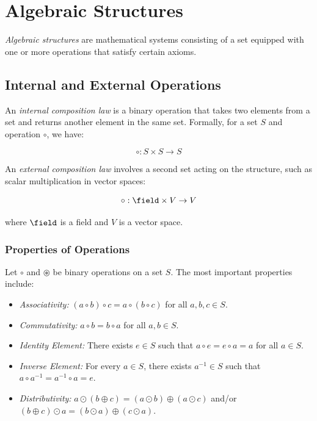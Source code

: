\chapter{Algebraic Structures}

\emph{Algebraic structures} are mathematical systems consisting of a set equipped with one or more operations
that satisfy certain axioms.

\section{Internal and External Operations}

An \emph{internal composition law} is a binary operation that takes two elements from a set and returns another element in the same set.
Formally, for a set \(S\) and operation \(\circ\), we have:

\[
	\circ: S \times S \to S
\]

An \emph{external composition law} involves a second set acting on the structure, such as scalar multiplication in vector spaces:

\[
	\circ: \field \times V \to V
\]

where \(\field\) is a field and \(V\) is a vector space.

\subsection{Properties of Operations}

Let \(\circ\) and \(\circledast\) be binary operations on a set \(S\). The most important properties include:

\begin{itemize}

	\item \emph{Associativity:} \((a \circ b) \circ c  = a \circ (b \circ c)\) for all \(a,b,c \in S\).

	\item \emph{Commutativity:} \(a \circ b = b \circ a\) for all \(a,b \in S\).

	\item \emph{Identity Element:} There exists \(e \in S\) such that \(a \circ e = e \circ a = a\) for all \(a \in S\).

	\item \emph{Inverse Element:} For every \(a \in S\), there exists \(a^{-1} \in S\) such that \(a \circ a^{-1} = a^{-1} \circ a = e\).

	\item \emph{Distributivity:} \(a \odot (b \oplus c) = (a \odot b) \oplus (a \odot c)\) and/or \((b \oplus c) \odot a = (b \odot a) \oplus
	      (c \odot a)\).

\end{itemize}

